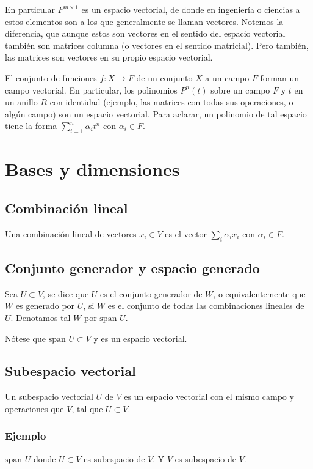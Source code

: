 \documentclass{article}
\begin{document}
En particular $F^{m\times 1}$ es un espacio vectorial, de donde
en ingeniería o ciencias a estos elementos son a los que generalmente se llaman vectores. Notemos la diferencia, que aunque estos son vectores en el sentido del espacio vectorial también son matrices columna (o vectores en el sentido matricial). Pero también, las matrices son vectores en su propio espacio vectorial.

El conjunto de funciones $f: X \rightarrow F$ de un conjunto $X$
a un campo $F$ forman un campo vectorial. En particular, los polinomios $P^n(t)$ sobre un campo $F$ y $t$ en un anillo $R$ con identidad (ejemplo, las matrices con todas sus operaciones, o algún campo) son un espacio vectorial. Para aclarar, un polinomio de tal espacio tiene
la forma $\sum^n_{i=1} \alpha_i t^n$ con $\alpha_i\in F$.
\newpage

\section{Bases y dimensiones}
\subsection{Combinación lineal}
Una combinación lineal de vectores $x_i \in V$ es el vector $\sum_i \alpha_i x_i$ con $\alpha_i\in F$.

\newcommand{\spn}{\text{span }}
\subsection{Conjunto generador y espacio generado}
Sea $U\subset V$, se dice que $U$ es el conjunto generador de $W$,
o equivalentemente que $W$ es generado por $U$, si 
$W$ es el conjunto de todas las combinaciones lineales de $U$.
Denotamos tal $W$ por $\spn U$.

Nótese que $\spn U\subset V$ y es un espacio vectorial.

\subsection{Subespacio vectorial}
Un subespacio vectorial $U$ de $V$ es un espacio vectorial
con el mismo campo y operaciones que $V$, tal que $U\subset V$.

\subsubsection*{Ejemplo}
$\spn U$ donde $U\subset V$ es subespacio de $V$. Y $V$ es subespacio de $V$.
\end{document}
